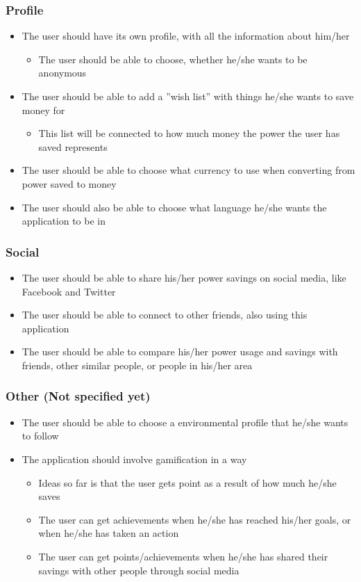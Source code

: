 \subsubsection{Profile}

\begin{itemize}
\item The user should have its own profile, with all the information about him/her
\begin{itemize}
\item The user should be able to choose, whether he/she wants to be anonymous
\end{itemize}
\item The user should be able to add a ''wish list'' with things he/she wants to save money for
\begin{itemize}
\item This list will be connected to how much money the power the user has saved represents
\end{itemize}
\item The user should be able to choose what currency to use when converting from power saved to money
\item The user should also be able to choose what language he/she wants the application to be in
\end{itemize}


\subsubsection{Social}
\begin{itemize}
\item The user should be able to share his/her power savings on social media, like Facebook and Twitter
\item The user should be able to connect to other friends, also using this application
\item The user should be able to compare his/her power usage and savings with friends, other similar people, or people in his/her area
\end{itemize}

\subsubsection{Other (Not specified yet)}
\begin{itemize}
\item The user should be able to choose a environmental profile that he/she wants to follow
\item The application should involve gamification in a way
\begin{itemize}
\item Ideas so far is that the user gets point as a result of how much he/she saves
\item The user can get achievements when he/she has reached his/her goals, or when he/she has taken an action
\item The user can get points/achievements when he/she has shared their savings with other people through social media
\end{itemize}
\end{itemize}


